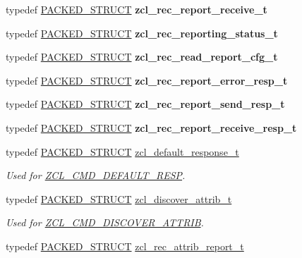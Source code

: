 \begin{DoxyCompactItemize}
typedef \hyperlink{group___s_x_a_ga4233297bd31be5c273d4fb0758cc54d7}{P\+A\+C\+K\+E\+D\+\_\+\+S\+T\+R\+U\+CT} {\bfseries zcl\+\_\+rec\+\_\+report\+\_\+receive\+\_\+t}
\item 
typedef \hyperlink{group___s_x_a_ga4233297bd31be5c273d4fb0758cc54d7}{P\+A\+C\+K\+E\+D\+\_\+\+S\+T\+R\+U\+CT} {\bfseries zcl\+\_\+rec\+\_\+reporting\+\_\+status\+\_\+t}
\item 
typedef \hyperlink{group___s_x_a_ga4233297bd31be5c273d4fb0758cc54d7}{P\+A\+C\+K\+E\+D\+\_\+\+S\+T\+R\+U\+CT} {\bfseries zcl\+\_\+rec\+\_\+read\+\_\+report\+\_\+cfg\+\_\+t}
\item 
typedef \hyperlink{group___s_x_a_ga4233297bd31be5c273d4fb0758cc54d7}{P\+A\+C\+K\+E\+D\+\_\+\+S\+T\+R\+U\+CT} {\bfseries zcl\+\_\+rec\+\_\+report\+\_\+error\+\_\+resp\+\_\+t}
\item 
typedef \hyperlink{group___s_x_a_ga4233297bd31be5c273d4fb0758cc54d7}{P\+A\+C\+K\+E\+D\+\_\+\+S\+T\+R\+U\+CT} {\bfseries zcl\+\_\+rec\+\_\+report\+\_\+send\+\_\+resp\+\_\+t}
\item 
typedef \hyperlink{group___s_x_a_ga4233297bd31be5c273d4fb0758cc54d7}{P\+A\+C\+K\+E\+D\+\_\+\+S\+T\+R\+U\+CT} {\bfseries zcl\+\_\+rec\+\_\+report\+\_\+receive\+\_\+resp\+\_\+t}
\item 
typedef \hyperlink{group___s_x_a_ga4233297bd31be5c273d4fb0758cc54d7}{P\+A\+C\+K\+E\+D\+\_\+\+S\+T\+R\+U\+CT} \hyperlink{group__zcl_ga71b28f3a9303e556e06d1a4d18c7a834}{zcl\+\_\+default\+\_\+response\+\_\+t}
\begin{DoxyCompactList}\small\item\em Used for \hyperlink{group__zcl_ga92499f538455b8d5a525510fba54adb2}{Z\+C\+L\+\_\+\+C\+M\+D\+\_\+\+D\+E\+F\+A\+U\+L\+T\+\_\+\+R\+E\+SP}. \end{DoxyCompactList}\item 
typedef \hyperlink{group___s_x_a_ga4233297bd31be5c273d4fb0758cc54d7}{P\+A\+C\+K\+E\+D\+\_\+\+S\+T\+R\+U\+CT} \hyperlink{group__zcl_gab0970af8e1b078745a55523dd60bdff6}{zcl\+\_\+discover\+\_\+attrib\+\_\+t}
\begin{DoxyCompactList}\small\item\em Used for \hyperlink{group__zcl_ga2919d6fc8068efac4c9969938a4b9ff5}{Z\+C\+L\+\_\+\+C\+M\+D\+\_\+\+D\+I\+S\+C\+O\+V\+E\+R\+\_\+\+A\+T\+T\+R\+IB}. \end{DoxyCompactList}\item 
typedef \hyperlink{group___s_x_a_ga4233297bd31be5c273d4fb0758cc54d7}{P\+A\+C\+K\+E\+D\+\_\+\+S\+T\+R\+U\+CT} \hyperlink{group__zcl_ga4c81303b52f05c2819ac615fa92e0e5f}{zcl\+\_\+rec\+\_\+attrib\+\_\+report\+\_\+t}

\end{DoxyCompactItemize}
